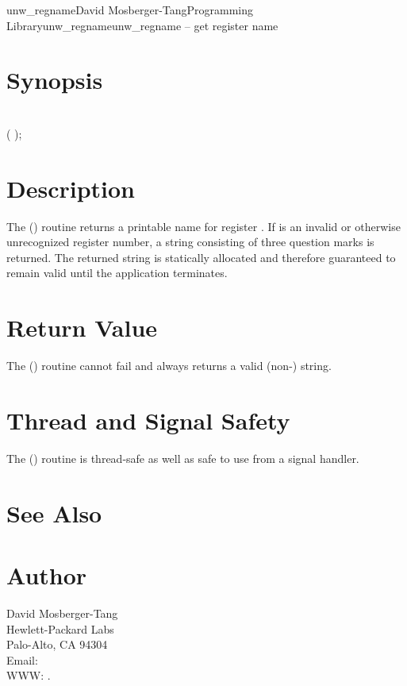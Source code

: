 \documentclass{article}
\begin{document}
\begin{Name}{3}{unw\_regname}{David Mosberger-Tang}{Programming Library}{unw\_regname}unw\_regname -- get register name
\end{Name}

\section{Synopsis}

\\

( );\\

\section{Description}

The () routine returns a printable name for
register .  If  is an invalid or otherwise
unrecognized register number, a string consisting of three question
marks is returned.  The returned string is statically allocated and
therefore guaranteed to remain valid until the application terminates.

\section{Return Value}

The () routine cannot fail and always returns a
valid (non-) string.

\section{Thread and Signal Safety}

The () routine is thread-safe as well as safe to
use from a signal handler.

\section{See Also}


\section{Author}

\noindent
David Mosberger-Tang\\
Hewlett-Packard Labs\\
Palo-Alto, CA 94304\\
Email: \\
WWW: .
\LatexManEnd
\end{document}
